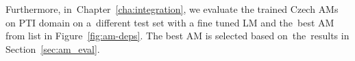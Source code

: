 Furthermore, in~Chapter~\ref{cha:integration}, we evaluate the trained Czech \acp{AM} on \acl{PTI} domain on a~different test set with a fine tuned \ac{LM} and the~best \ac{AM} from list in Figure~\ref{fig:am-deps}.
The best \ac{AM} is selected based on~the~results in Section~\ref{sec:am_eval}.




% 
